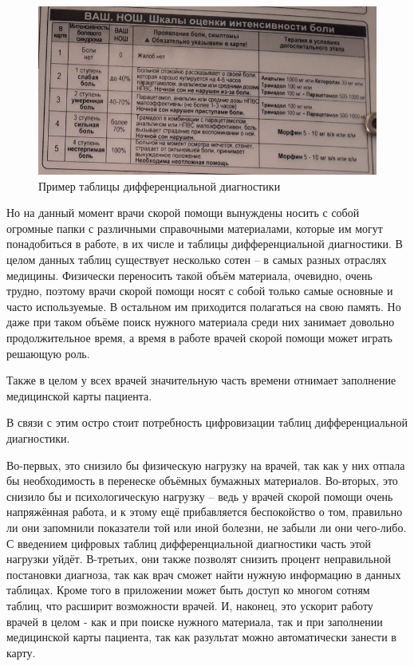 \begin{figure}
  \includegraphics[scale=0.6]{src/ВАШ. НОШ. Шкалы оценки интенсивности боли.jpg}
  \caption{Пример таблицы дифференциальной диагностики}
  \label{fig:tab1}
\end{figure}

Но на данный момент врачи скорой помощи вынуждены носить с собой огромные папки с различными справочными материалами, которые им могут понадобиться в работе, в их числе и таблицы дифференциальной диагностики. В целом данных таблиц существует несколько сотен -- в самых разных отраслях медицины. Физически переносить такой объём материала, очевидно, очень трудно, поэтому врачи скорой помощи носят с собой только самые основные и часто используемые. В остальном им приходится полагаться на свою память. Но даже при таком объёме поиск нужного материала среди них занимает довольно продолжительное время, а время в работе врачей скорой помощи может играть решающую роль. 

Также в целом у всех врачей значительную часть времени отнимает заполнение медицинской карты пациента.

В связи с этим остро стоит потребность цифровизации таблиц дифференциальной диагностики.

Во-первых, это снизило бы физическую нагрузку на врачей, так как у них отпала бы необходимость в перенеске объёмных бумажных материалов. Во-вторых, это снизило бы и психологическую нагрузку -- ведь у врачей скорой помощи очень напряжённая работа, и к этому ещё прибавляется беспокойство о том, правильно ли они запомнили показатели той или иной болезни, не забыли ли они чего-либо. С введением цифровых таблиц дифференциальной диагностики  часть этой нагрузки уйдёт. В-третьих, они также позволят снизить процент неправильной постановки диагноза, так как врач сможет найти нужную информацию в данных таблицах. Кроме того в приложении может быть доступ ко многом сотням таблиц, что расширит возможности врачей. И, наконец, это ускорит работу врачей в целом - как и при поиске нужного материала, так и при заполнении медицинской карты пациента, так как разультат можно автоматически занести в карту.

